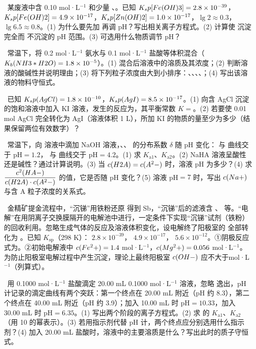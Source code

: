 \begin{xiti}
\item {}\ 某废液中含 0.10 mol·L$^{-1}$  和少量 、。已知 $K_sp[Fe(OH)3]=2.8\times10^{-39}$，$K_sp[Fe(OH)2]=4.9\times10^{-17}$，$K_sp[Zn(OH)2]=1.0\times10^{-17}$，$\lg2\approx0.3$，$\lg6.5\approx0.8$。(1) 为什么要先加  再调 pH？写出相关离子方程式。(2) 计算使  沉淀完全而  不沉淀的 pH 范围。(3) 可选用什么物质调节 pH？

\item {}\ 常温下，将 0.2 mol·L$^{-1}$ 氨水与 0.1 mol·L$^{-1}$ 盐酸等体积混合（$K_b(NH3*H2O)=1.8\times10^{-5}$）。(1) 混合后溶液中的溶质及其浓度；(2) 判断溶液的酸碱性并说明理由；(3) 将下列粒子浓度由大到小排序：、、、、；(4) 写出该溶液的物料守恒式。

\item {}\ 已知 $K_sp(AgCl)=1.8\times10^{-10}$，$K_sp(AgI)=8.5\times10^{-17}$。(1) 向含 AgCl 沉淀的饱和溶液中加入 KI 溶液，发生的反应为\tk，其平衡常数 $K=$\tk。(2) 若要使 0.01 mol AgCl 完全转化为 AgI（溶液体积 1 L），所加 KI 的物质的量至少为多少（结果保留两位有效数字）？
\end{xiti}

\begin{xiti}
\item {}\ 常温下，向  溶液中滴加 NaOH 溶液，、、 的分布系数 $\delta$ 随 pH 变化： 与  曲线交于 pH$=1.2$， 与  曲线交于 pH$=4.2$。(1) 求 $K_{\text{a}1}$、$K_{\text{a}2}$。(2) NaHA 溶液呈酸性还是碱性？通过计算说明。(3) 当 $c(H2A)=c(A^2-)$ 时，溶液 pH 为多少？(4) 求 $\dfrac{c^2(HA-)}{c(H2A)\cdot c(A^2-)}$ 的值，它是否随 pH 变化？(5) 溶液 pH$=7$ 时，写出 $c(Na+)$ 与含 A 粒子浓度的关系式。

\item {}\ 金精矿提金流程中，“沉锑”用铁粉还原 \ce{[SbCl4]-} 得到 Sb，“沉锑”后的滤液含 、 等。“电解”在用阴离子交换膜隔开的电解池中进行，一定条件下实现“沉锑”试剂（铁粉）的回收利用。忽略生成气体的反应及溶液体积变化，设电解终了阳极室的  全部转化为 。已知 $K_\text{sp}$（298 K）： $2.8\times10^{-39}$， $4.9\times10^{-17}$， $5.6\times10^{-12}$。①阴极反应式为\tk。②初始电解液中 $c(Fe^2+)=1.4$ mol·L$^{-1}$，$c(Mg^2+)=0.056$ mol·L$^{-1}$。为防止阳极室电解过程中产生沉淀，理论上最终阳极室 $c(OH-)$ 应不大于\tk mol·L$^{-1}$（列算式）。

\item {}\ 用 0.1000 mol·L$^{-1}$ 盐酸滴定 20.00 mL 0.1000 mol·L$^{-1}$  溶液，忽略  逸出，pH 计记录的滴定曲线有两个突跃：第一个终点在 20.00 mL 附近（pH 约 8.3），第二个终点在 40.00 mL 附近（pH 约 3.9）；加入 10.00 mL 时 pH$=10.33$，加入 30.00 mL 时 pH$=6.35$。(1) 写出两个阶段的离子方程式。(2) 求  的 $K_{\text{a}1}$、$K_{\text{a}2}$（用 10 的幂表示）。(3) 若用指示剂代替 pH 计，两个终点应分别选用什么指示剂？(4) 加入 20.00 mL 盐酸时，溶液中的主要溶质是什么？写出此时的质子守恒式。
\end{xiti}


